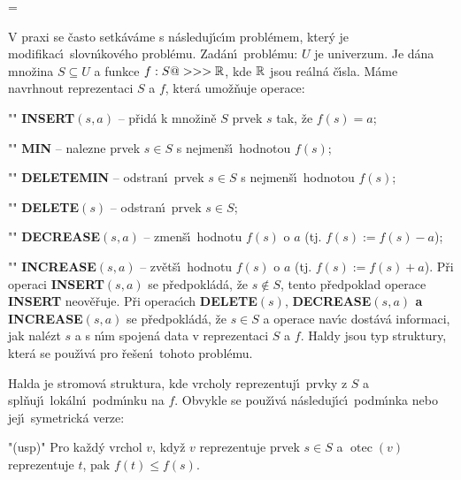 


\magnification=




\def \emph#1{\underbar{#1}}
\def \Prob{\operatorname{Prob}}
\def \count{\operatorname{count}}
\def \NIL{\operatorname{NIL}}
\def \otec{\operatorname{otec}}
\def \list{\operatorname{list}}
\def \Prv{\operatorname{Prv}}
\def \Nasl{\operatorname{Nasl}}
\def \levy{\operatorname{levy}}
\def \pravy{\operatorname{pravy}}
\def \key{\operatorname{key}}
\def \Prst{\operatorname{Prst}}
\def \hloubka{\operatorname{hloubka}}
\def \bratr{\operatorname{bratr}}
\def \npl{\operatorname{npl}}
\def \Cont{\operatorname{Cont}}

\flushpar V praxi se \v casto setk\'av\'ame s n\'asleduj\'\i c\'\i m 
probl\'emem, kter\'y je modifikac\'\i\ slovn\'\i kov\'eho 
probl\'emu.\newline 
Zad\'an\'\i\ probl\'emu: $U$ je univerzum. Je d\'ana mno\v zina 
$S\subseteq U$ a funkce $f:S@>>>\Bbb R$, kde $\Bbb R$ jsou re\'aln\'a \v c\'\i sla.
M\'ame navrhnout reprezentaci $S$ a $f$, kter\'a umo\v z\v nuje 
operace:
\roster
\item"{}"
{\bf INSERT$(s,a)$} -- p\v rid\'a k mno\v zin\v e $S$ prvek $s$ tak, \v ze 
$f(s)=a$;
\item"{}" 
{\bf MIN} -- nalezne prvek $s\in S$ s nejmen\v s\'\i\ hodnotou 
$f(s)$;
\item"{}" 
{\bf DELETEMIN} -- odstran\'\i\ prvek $s\in S$ s nejmen\v s\'\i\ hodnotou 
$f(s)$;
\item"{}" 
{\bf DELETE$(s)$} -- odstran\'\i\ prvek $s\in S$;
\item"{}"
{\bf DECREASE$(s,a)$} -- zmen\v s\'\i\ hodnotu $f(s)$ o $a$ (tj. 
$f(s):=f(s)-a$);
\item"{}"
{\bf INCREASE$(s,a)$} -- zv\v et\v s\'\i\ hodnotu $f(s)$ o $a$ (tj. 
$f(s):=f(s)+a$).
\endroster 
P\v ri operaci {\bf INSERT$(s,a)$} se p\v redpokl\'ad\'a, \v ze $
s\notin S$, tento 
p\v redpoklad operace {\bf INSERT} neov\v e\v ruje. P\v ri operac\'\i ch {\bf DE\-LE\-TE$
(s)$},
{\bf DECREASE$(s,a)$ a INCREASE$(s,a)$} se p\v red\-pokl\'ad\'a, \v ze $
s\in S$ a 
operace nav\'\i c dost\'av\'a informaci, jak nal\'ezt $s$ a s n\'\i m 
spojen\'a data v reprezentaci $S$ a $f$. Haldy jsou typ 
struktury, kter\'a se pou\v z\'\i v\'a pro \v re\v sen\'\i\ tohoto probl\'emu. 
\medskip

\flushpar Halda je stromov\'a struktura, kde vrcholy 
reprezentuj\'\i\ prvky z $S$ a spl\v nuj\'\i\ lok\'aln\'\i\ podm\'\i nku na 
$f$. Obvykle se pou\v z\'\i v\'a n\'asleduj\'\i c\'\i\ podm\'\i nka nebo 
jej\'\i\ symetrick\'a verze:
\bigskip
\roster
\item"{(usp)}"
Pro ka\v zd\'y vrchol $v$, kdy\v z $v$ reprezentuje prvek 
$s\in S$ a $\otec(v)$ reprezentuje $t$, pak $f(t)\le f(s)$.
\endroster


